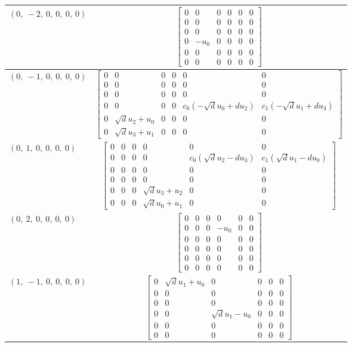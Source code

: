 \documentclass[11pt]{article}
\theoremstyle{definition}
\begin{document}
\begin{longtable}{|l|c|}
    \hline
    $\left( 0, \  -2, \  0, \  0, \  0, \  0\right)$ & ${\left[\begin{matrix}0 & 0 & 0 & 0 & 0 & 0\\0 & 0 & 0 & 0 & 0 & 0\\0 & 0 & 0 & 0 & 0 & 0\\0 & - u_{0} & 0 & 0 & 0 & 0\\0 & 0 & 0 & 0 & 0 & 0\\0 & 0 & 0 & 0 & 0 & 0\end{matrix}\right]}$ \\
    \hline
    $\left( 0, \  -1, \  0, \  0, \  0, \  0\right)$ & ${\left[\begin{matrix}0 & 0 & 0 & 0 & 0 & 0\\0 & 0 & 0 & 0 & 0 & 0\\0 & 0 & 0 & 0 & 0 & 0\\0 & 0 & 0 & 0 & c_{0} \left(- \sqrt{d} u_{0} + d u_{2}\right) & c_{1} \left(- \sqrt{d} u_{1} + d u_{3}\right)\\0 & \sqrt{d} u_{2} + u_{0} & 0 & 0 & 0 & 0\\0 & \sqrt{d} u_{3} + u_{1} & 0 & 0 & 0 & 0\end{matrix}\right]}$ \\
    \hline
    $\left( 0, \  1, \  0, \  0, \  0, \  0\right)$ & ${\left[\begin{matrix}0 & 0 & 0 & 0 & 0 & 0\\0 & 0 & 0 & 0 & c_{0} \left(\sqrt{d} u_{2} - d u_{3}\right) & c_{1} \left(\sqrt{d} u_{1} - d u_{0}\right)\\0 & 0 & 0 & 0 & 0 & 0\\0 & 0 & 0 & 0 & 0 & 0\\0 & 0 & 0 & \sqrt{d} u_{3} + u_{2} & 0 & 0\\0 & 0 & 0 & \sqrt{d} u_{0} + u_{1} & 0 & 0\end{matrix}\right]}$ \\
    \hline
    $\left( 0, \  2, \  0, \  0, \  0, \  0\right)$ & ${\left[\begin{matrix}0 & 0 & 0 & 0 & 0 & 0\\0 & 0 & 0 & - u_{0} & 0 & 0\\0 & 0 & 0 & 0 & 0 & 0\\0 & 0 & 0 & 0 & 0 & 0\\0 & 0 & 0 & 0 & 0 & 0\\0 & 0 & 0 & 0 & 0 & 0\end{matrix}\right]}$ \\
    \hline
    $\left( 1, \  -1, \  0, \  0, \  0, \  0\right)$ & ${\left[\begin{matrix}0 & \sqrt{d} u_{1} + u_{0} & 0 & 0 & 0 & 0\\0 & 0 & 0 & 0 & 0 & 0\\0 & 0 & 0 & 0 & 0 & 0\\0 & 0 & \sqrt{d} u_{1} - u_{0} & 0 & 0 & 0\\0 & 0 & 0 & 0 & 0 & 0\\0 & 0 & 0 & 0 & 0 & 0\end{matrix}\right]}$ \\

\end{longtable}
\end{document}
